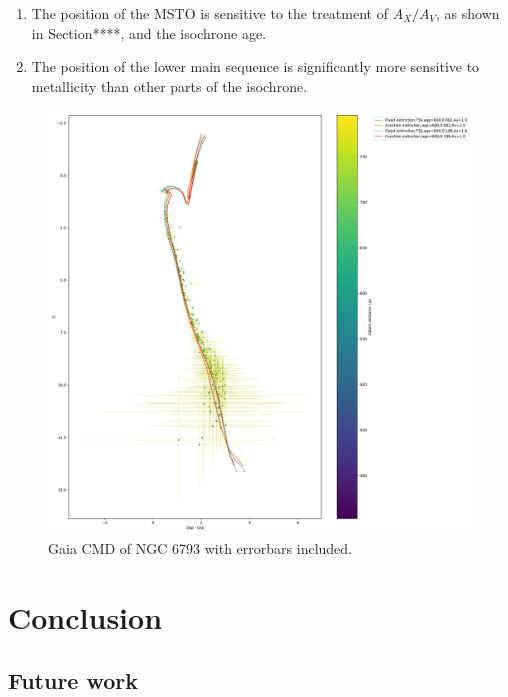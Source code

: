 \documentclass[a4paper, 11pt, oneside]{LJMU_Astro_Thesis}  %
\begin{document}
\begin{enumerate}
\item The position of the MSTO is sensitive to the treatment of $A_{X}/A_{V}$, as shown in Section****, and the isochrone age.
\item The position of the lower main sequence is significantly more sensitive to metallicity than other parts of the isochrone.
\end{enumerate}

\begin{figure}[h]
\begin{center}
\includegraphics[scale=0.3]{../NGC_6793_CMD_FeH_0p002_0p198_Av_1p0_600Myr_isochrones_both_errorbars_T5k.pdf}
\caption{Gaia CMD of NGC 6793 with errorbars included.}
\label{ngc_errorbars}
\end{center}
\end{figure}

\section{Conclusion}
\subsection{Future work}

\end{document}
